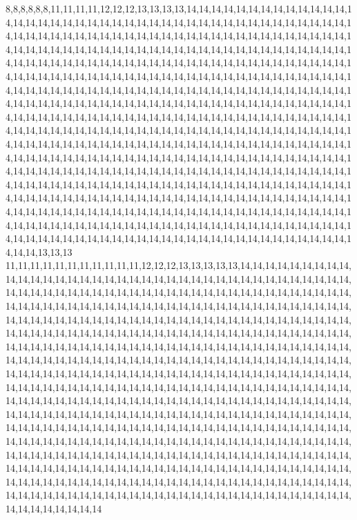 8,8,8,8,8,8,11,11,11,11,12,12,12,13,13,13,13,14,14,14,14,14,14,14,14,14,14,14,14,14,14,14,14,14,14,14,14,14,14,14,14,14,14,14,14,14,14,14,14,14,14,14,14,14,14,14,14,14,14,14,14,14,14,14,14,14,14,14,14,14,14,14,14,14,14,14,14,14,14,14,14,14,14,14,14,14,14,14,14,14,14,14,14,14,14,14,14,14,14,14,14,14,14,14,14,14,14,14,14,14,14,14,14,14,14,14,14,14,14,14,14,14,14,14,14,14,14,14,14,14,14,14,14,14,14,14,14,14,14,14,14,14,14,14,14,14,14,14,14,14,14,14,14,14,14,14,14,14,14,14,14,14,14,14,14,14,14,14,14,14,14,14,14,14,14,14,14,14,14,14,14,14,14,14,14,14,14,14,14,14,14,14,14,14,14,14,14,14,14,14,14,14,14,14,14,14,14,14,14,14,14,14,14,14,14,14,14,14,14,14,14,14,14,14,14,14,14,14,14,14,14,14,14,14,14,14,14,14,14,14,14,14,14,14,14,14,14,14,14,14,14,14,14,14,14,14,14,14,14,14,14,14,14,14,14,14,14,14,14,14,14,14,14,14,14,14,14,14,14,14,14,14,14,14,14,14,14,14,14,14,14,14,14,14,14,14,14,14,14,14,14,14,14,14,14,14,14,14,14,14,14,14,14,14,14,14,14,14,14,14,14,14,14,14,14,14,14,14,14,14,14,14,14,14,14,14,14,14,14,14,14,14,14,14,14,14,14,14,14,14,14,14,14,14,14,14,14,14,14,14,14,14,14,14,14,14,14,14,14,14,14,14,14,14,14,14,14,14,14,14,14,14,14,14,14,14,14,14,14,14,14,14,14,14,14,14,14,14,14,14,14,14,14,14,14,14,14,14,14,14,14,14,14,14,14,14,14,14,14,14,14,14,14,14,14,14,14,14,14,14,14,14,14,14,14,14,14,14,14,14,14,14,14,14,14,14,14,14,14,14,14,14,14,14,14,14,14,14,14,14,14,14,14,14,14,14,14,14,14,14,14,14,14,14,14,14,14,14,14,14,14,14,14,14,14,14,14,14,14,14,14,14,14,14,14,14,14,14,14,14,14,14,14,14,14,14,14,14,14,13,13,13
11,11,11,11,11,11,11,11,11,11,11,12,12,12,13,13,13,13,13,14,14,14,14,14,14,14,14,14,14,14,14,14,14,14,14,14,14,14,14,14,14,14,14,14,14,14,14,14,14,14,14,14,14,14,14,14,14,14,14,14,14,14,14,14,14,14,14,14,14,14,14,14,14,14,14,14,14,14,14,14,14,14,14,14,14,14,14,14,14,14,14,14,14,14,14,14,14,14,14,14,14,14,14,14,14,14,14,14,14,14,14,14,14,14,14,14,14,14,14,14,14,14,14,14,14,14,14,14,14,14,14,14,14,14,14,14,14,14,14,14,14,14,14,14,14,14,14,14,14,14,14,14,14,14,14,14,14,14,14,14,14,14,14,14,14,14,14,14,14,14,14,14,14,14,14,14,14,14,14,14,14,14,14,14,14,14,14,14,14,14,14,14,14,14,14,14,14,14,14,14,14,14,14,14,14,14,14,14,14,14,14,14,14,14,14,14,14,14,14,14,14,14,14,14,14,14,14,14,14,14,14,14,14,14,14,14,14,14,14,14,14,14,14,14,14,14,14,14,14,14,14,14,14,14,14,14,14,14,14,14,14,14,14,14,14,14,14,14,14,14,14,14,14,14,14,14,14,14,14,14,14,14,14,14,14,14,14,14,14,14,14,14,14,14,14,14,14,14,14,14,14,14,14,14,14,14,14,14,14,14,14,14,14,14,14,14,14,14,14,14,14,14,14,14,14,14,14,14,14,14,14,14,14,14,14,14,14,14,14,14,14,14,14,14,14,14,14,14,14,14,14,14,14,14,14,14,14,14,14,14,14,14,14,14,14,14,14,14,14,14,14,14,14,14,14,14,14,14,14,14,14,14,14,14,14,14,14,14,14,14,14,14,14,14,14,14,14,14,14,14,14,14,14,14,14,14,14,14,14,14,14,14,14,14,14,14,14,14,14,14,14,14,14,14,14,14,14,14,14,14,14,14,14,14,14,14,14,14,14,14,14,14,14,14,14,14,14,14,14,14,14,14,14,14,14,14,14,14,14,14,14,14,14,14,14,14,14,14,14,14,14,14,14,14,14,14,14,14,14,14,14,14,14,14,14,14,14,14,14,14,14,14,14,14,14,14,14,14,14,14,14,14,14,14,14,14,14,14,14,14,14,14
